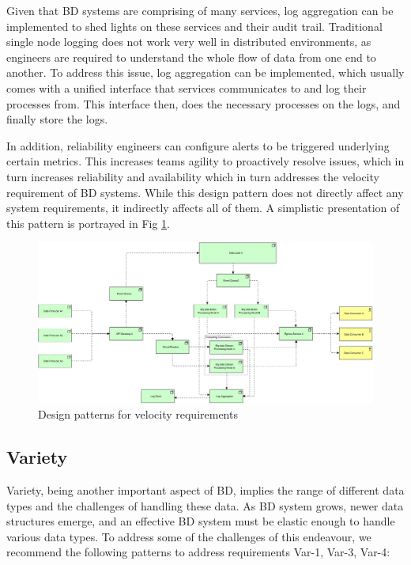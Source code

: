 \documentclass{bmcart}
\begin{document}
Given that BD systems are comprising of many services, log aggregation can be implemented to shed lights on these services and their audit trail. Traditional single node logging does not work very well in distributed environments, as engineers are required to understand the whole flow of data from one end to another. To address this issue, log aggregation can be implemented, which usually comes with a unified interface that services communicates to and log their processes from. This interface then, does the necessary processes on the logs, and finally store the logs. 

In addition, reliability engineers can configure alerts to be triggered underlying certain metrics. This increases teams agility to proactively resolve issues, which in turn increases reliability and availability which in turn addresses the velocity requirement of BD systems. While this design pattern does not directly affect any system requirements, it indirectly affects all of them. A simplistic presentation of this pattern is portrayed in Fig \ref{fig-vel-ra}. 


\begin{figure}[h!]
    \includegraphics[width=12cm]{Media/Velocity Requirement.jpg}
    \caption{Design patterns for velocity requirements}
    \label{fig-vel-ra}
\end{figure}


\subsection{Variety}

Variety, being another important aspect of BD, implies the range of different data types and the challenges of handling these data. As BD system grows, newer data structures emerge, and an effective BD system must be elastic enough to handle various data types. To address some of the challenges of this endeavour, we recommend the following patterns to address requirements Var-1, Var-3, Var-4:
\end{document}
